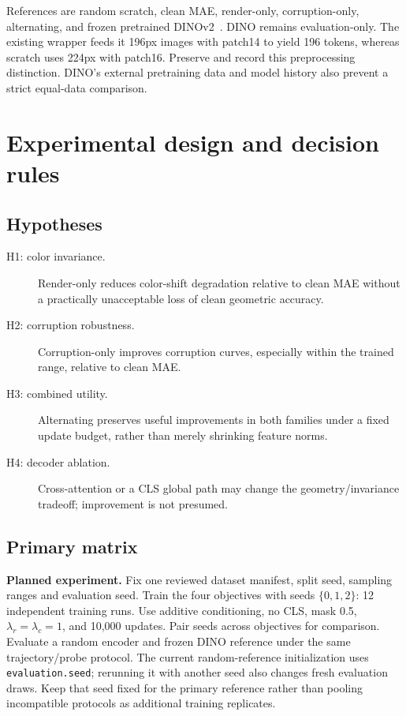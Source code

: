 \documentclass[11pt,a4paper]{article}
\newcommand{\code}[1]{\nolinkurl{#1}}
\newcommand{\plan}{\textbf{Planned experiment.} }
\begin{document}
References are random scratch, clean MAE, render-only, corruption-only, alternating,
and frozen pretrained DINOv2~\cite{dinov2}. DINO remains evaluation-only. The existing
wrapper feeds it 196px images with patch14 to yield 196 tokens, whereas scratch uses
224px with patch16. Preserve and record this preprocessing distinction. DINO's external
pretraining data and model history also prevent a strict equal-data comparison.

\section{Experimental design and decision rules}
\subsection{Hypotheses}
\begin{description}
\item[H1: color invariance.] Render-only reduces color-shift degradation relative
to clean MAE without a practically unacceptable loss of clean geometric accuracy.
\item[H2: corruption robustness.] Corruption-only improves corruption curves,
especially within the trained range, relative to clean MAE.
\item[H3: combined utility.] Alternating preserves useful improvements in both
families under a fixed update budget, rather than merely shrinking feature norms.
\item[H4: decoder ablation.] Cross-attention or a CLS global path may change the
geometry/invariance tradeoff; improvement is not presumed.
\end{description}

\subsection{Primary matrix}
\plan Fix one reviewed dataset manifest, split seed, sampling ranges and evaluation
seed. Train the four objectives with seeds $\{0,1,2\}$: 12 independent training runs.
Use additive conditioning, no CLS, mask 0.5, $\lambda_r=\lambda_c=1$, and 10,000 updates.
Pair seeds across objectives for comparison. Evaluate a random encoder and frozen
DINO reference under the same trajectory/probe protocol. The current random-reference
initialization uses \code{evaluation.seed}; rerunning it with another seed also changes
fresh evaluation draws. Keep that seed fixed for the primary reference rather than
pooling incompatible protocols as additional training replicates.
\end{document}
